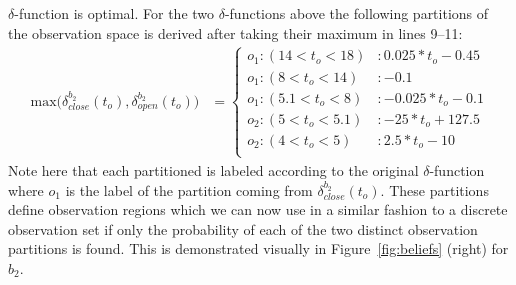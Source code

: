 \documentclass{article} %
\begin{document}
$\delta$-function is optimal. For the two $\delta$-functions above the following partitions of the observation space is derived after taking their maximum in lines 9--11: 
{\footnotesize
\vspace{-2mm}
\begin{align}
\mathrm{max} \Bigg(\delta_{close}^{b_2}(t_o),\delta_{open}^{b_2}(t_o)\Bigg) &= 
\begin{cases}
o_1: (14 < t_o< 18) &: 0.025*t_o - 0.45\\
o_1: (8 < t_o< 14) &:  -0.1\\
o_1: (5.1 < t_o< 8) &: - 0.025*t_o -0.1\\
o_2: (5 < t_o< 5.1) &: - 25*t_o + 127.5\\
o_2: (4 < t_o< 5) &:  2.5*t_o - 10\\
\end{cases}
\nonumber
\end{align}
}
Note here that each partitioned is labeled according to the original $\delta$-function where $o_1$ is the label of the partition coming from $\delta_{close}^{b_2}(t_o)$. 
These partitions define observation regions which we can now use in a similar fashion to a discrete observation set if only the probability of each of the two distinct observation partitions is found.  This is demonstrated visually
in Figure~\ref{fig:beliefs} (right) for $b_2$. %
\end{document}
